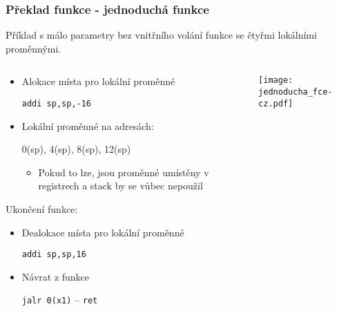 \documentclass{beamer}
\begin{document}
\begin{frame}
\frametitle{Překlad funkce - jednoduchá funkce}

Příklad s málo parametry bez vnitřního volání funkce se čtyřmi lokálními proměnnými.
\begin{columns}
\begin{column}{0.65\textwidth}
\begin{itemize}
 \item Alokace místa pro lokální proměnné 
 
 \texttt{addi  sp,sp,-16}
 \item Lokální proměnné na adresách: 
 
 0(sp), 4(sp), 8(sp), 12(sp)
\begin{itemize}
 \item Pokud to lze, jsou proměnné umístěny v registrech a stack by se vůbec nepoužil
\end{itemize}
\end{itemize}

Ukončení funkce:
\begin{itemize}
 \item Dealokace místa pro lokální proměnné 
 
 \texttt{addi  sp,sp,16}
 \item Návrat z funkce 
 
 \texttt{jalr 0(x1)} -- \texttt{ret} 
\end{itemize}
\end{column}
\begin{column}{0.35\textwidth}  
\texttt{[image: jednoducha\_fce-cz.pdf]}
\end{column}
\end{columns}

\end{frame}
\end{document}
